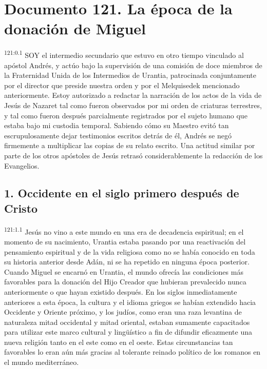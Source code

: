 \chapter{Documento 121. La época de la donación de Miguel}
\par
\textsuperscript{121:0.1} SOY el intermedio secundario que estuvo en otro tiempo vinculado al apóstol Andrés, y actúo bajo la supervisión de una comisión de doce miembros de la Fraternidad Unida de los Intermedios de Urantia, patrocinada conjuntamente por el director que preside nuestra orden y por el Melquisedek mencionado anteriormente. Estoy autorizado a redactar la narración de los actos de la vida de Jesús de Nazaret tal como fueron observados por mi orden de criaturas terrestres, y tal como fueron después parcialmente registrados por el sujeto humano que estaba bajo mi custodia temporal. Sabiendo cómo su Maestro evitó tan escrupulosamente dejar testimonios escritos detrás de él, Andrés se negó firmemente a multiplicar las copias de su relato escrito. Una actitud similar por parte de los otros apóstoles de Jesús retrasó considerablemente la redacción de los Evangelios.

\section*{1. Occidente en el siglo primero después de Cristo}
\par
\textsuperscript{121:1.1} Jesús no vino a este mundo en una era de decadencia espiritual; en el momento de su nacimiento, Urantia estaba pasando por una reactivación del pensamiento espiritual y de la vida religiosa como no se había conocido en toda su historia anterior desde Adán, ni se ha repetido en ninguna época posterior. Cuando Miguel se encarnó en Urantia, el mundo ofrecía las condiciones más favorables para la donación del Hijo Creador que hubieran prevalecido nunca anteriormente o que hayan existido después. En los siglos inmediatamente anteriores a esta época, la cultura y el idioma griegos se habían extendido hacia Occidente y Oriente próximo, y los judíos, como eran una raza levantina de naturaleza mitad occidental y mitad oriental, estaban sumamente capacitados para utilizar este marco cultural y ling\"uístico a fin de difundir eficazmente una nueva religión tanto en el este como en el oeste. Estas circunstancias tan favorables lo eran aún más gracias al tolerante reinado político de los romanos en el mundo mediterráneo.

